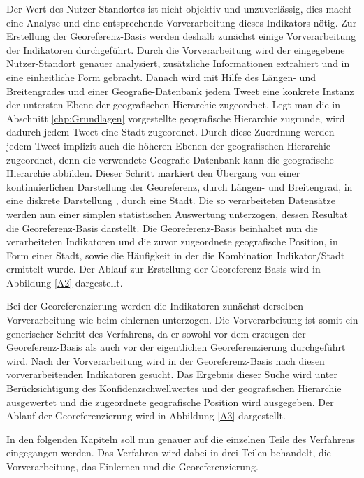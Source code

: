 	
	Der Wert des Nutzer-Standortes ist nicht objektiv und unzuverlässig, dies macht eine Analyse und eine entsprechende Vorverarbeitung dieses Indikators nötig.
	Zur Erstellung der Georeferenz-Basis werden deshalb zunächst einige Vorverarbeitung der Indikatoren durchgeführt.
	Durch die Vorverarbeitung wird der eingegebene Nutzer-Standort genauer analysiert, zusätzliche Informationen extrahiert und in eine einheitliche Form gebracht.
	Danach wird mit Hilfe des Längen- und Breitengrades und einer Geografie-Datenbank jedem Tweet eine konkrete Instanz der untersten Ebene der geografischen Hierarchie zugeordnet.
	Legt man die in Abschnitt \ref{chp:Grundlagen} vorgestellte geografische Hierarchie zugrunde, wird dadurch jedem Tweet eine Stadt zugeordnet.
	Durch diese Zuordnung werden jedem Tweet implizit auch die höheren Ebenen der geografischen Hierarchie zugeordnet, denn die verwendete Geografie-Datenbank kann die geografische Hierarchie abbilden.   	 
	Dieser Schritt markiert den Übergang von einer kontinuierlichen Darstellung der Georeferenz, durch Längen- und Breitengrad, in eine diskrete Darstellung , durch eine Stadt. 
	Die so verarbeiteten Datensätze werden nun einer simplen statistischen Auswertung unterzogen, dessen Resultat die Georeferenz-Basis darstellt.
	Die Georeferenz-Basis beinhaltet nun die verarbeiteten Indikatoren und die zuvor zugeordnete geografische Position, in Form einer Stadt, sowie die Häufigkeit in der die Kombination Indikator/Stadt ermittelt wurde.
	Der Ablauf zur Erstellung der Georeferenz-Basis wird in Abbildung \ref{A2} dargestellt.

	Bei der Georeferenzierung werden die Indikatoren zunächst derselben Vorverarbeitung wie beim einlernen unterzogen.
	Die Vorverarbeitung ist somit ein generischer Schritt des Verfahrens, da er sowohl vor dem erzeugen der Georeferenz-Basis als auch vor der eigentlichen Georeferenzierung durchgeführt wird.
	Nach der Vorverarbeitung wird in der Georeferenz-Basis nach diesen vorverarbeitenden Indikatoren gesucht.
	Das Ergebnis dieser Suche wird unter Berücksichtigung des Konfidenzschwellwertes und der geografischen Hierarchie ausgewertet und die zugeordnete geografische Position wird ausgegeben.  
	Der Ablauf der Georeferenzierung wird in Abbildung \ref{A3} dargestellt. 


	In den folgenden Kapiteln soll nun genauer auf die einzelnen Teile des Verfahrens eingegangen werden. 
	Das Verfahren wird dabei in drei Teilen behandelt, die Vorverarbeitung, das Einlernen und die Georeferenzierung.

